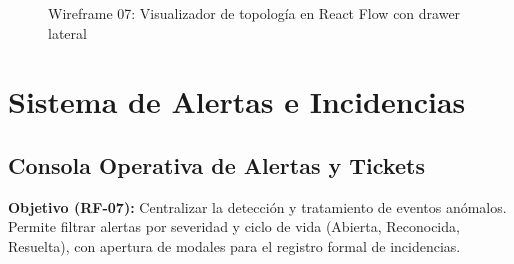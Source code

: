 \documentclass[12pt,a4paper]{report}
\begin{document}
\begin{figure}[htbp]
\begin{tikzpicture}[
  scale=0.88, every node/.style={transform shape}
]
\end{tikzpicture}
\caption{Wireframe 07: Visualizador de topología en React Flow con drawer lateral}\label{fig:wf_topologia}
\end{figure}

\newpage
\chapter{Sistema de Alertas e Incidencias}

\section{Consola Operativa de Alertas y Tickets}

\textbf{Objetivo (RF-07):} Centralizar la detección y tratamiento de eventos anómalos. Permite filtrar alertas por severidad y ciclo de vida (Abierta, Reconocida, Resuelta), con apertura de modales para el registro formal de incidencias.
\end{document}
